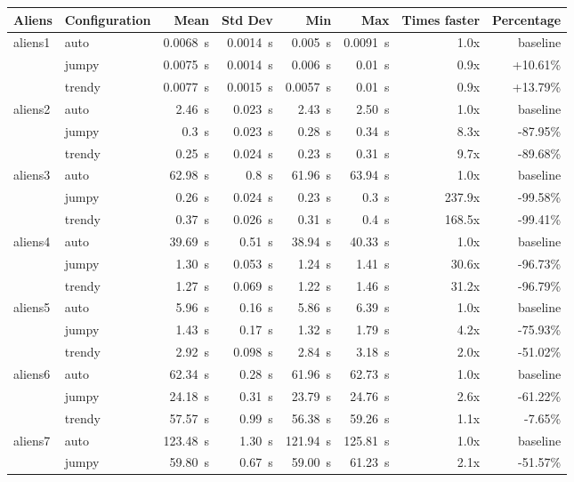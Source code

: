 \documentclass[11pt]{article}
\begin{document}
\begin{table}[h]
  \centering
  \begin{tabular}{|llrrrrrr|}
    \hline
    Aliens & Configuration & Mean & Std Dev & Min & Max & Times faster & Percentage \\
    \hline
    aliens1 & auto & 0.0068~s & 0.0014~s & 0.005~s & 0.0091~s & 1.0x & baseline \\
    & jumpy & 0.0075~s & 0.0014~s & 0.006~s & 0.01~s & 0.9x & +10.61\% \\
    & trendy & 0.0077~s & 0.0015~s & 0.0057~s & 0.01~s & 0.9x & +13.79\% \\
    \hline
    aliens2 & auto & 2.46~s & 0.023~s & 2.43~s & 2.50~s & 1.0x & baseline \\
    & jumpy & 0.3~s & 0.023~s & 0.28~s & 0.34~s & 8.3x & -87.95\% \\
    & trendy & 0.25~s & 0.024~s & 0.23~s & 0.31~s & 9.7x & -89.68\% \\
    \hline
    aliens3 & auto & 62.98~s & 0.8~s & 61.96~s & 63.94~s & 1.0x & baseline \\
    & jumpy & 0.26~s & 0.024~s & 0.23~s & 0.3~s & 237.9x & -99.58\% \\
    & trendy & 0.37~s & 0.026~s & 0.31~s & 0.4~s & 168.5x & -99.41\% \\
    \hline
    aliens4 & auto & 39.69~s & 0.51~s & 38.94~s & 40.33~s & 1.0x & baseline \\
    & jumpy & 1.30~s & 0.053~s & 1.24~s & 1.41~s & 30.6x & -96.73\% \\
    & trendy & 1.27~s & 0.069~s & 1.22~s & 1.46~s & 31.2x & -96.79\% \\
    \hline
    aliens5 & auto & 5.96~s & 0.16~s & 5.86~s & 6.39~s & 1.0x & baseline \\
    & jumpy & 1.43~s & 0.17~s & 1.32~s & 1.79~s & 4.2x & -75.93\% \\
    & trendy & 2.92~s & 0.098~s & 2.84~s & 3.18~s & 2.0x & -51.02\% \\
    \hline
    aliens6 & auto & 62.34~s & 0.28~s & 61.96~s & 62.73~s & 1.0x & baseline \\
    & jumpy & 24.18~s & 0.31~s & 23.79~s & 24.76~s & 2.6x & -61.22\% \\
    & trendy & 57.57~s & 0.99~s & 56.38~s & 59.26~s & 1.1x & -7.65\% \\
    \hline
    aliens7 & auto & 123.48~s & 1.30~s & 121.94~s & 125.81~s & 1.0x & baseline \\
    & jumpy & 59.80~s & 0.67~s & 59.00~s & 61.23~s & 2.1x & -51.57\% \\

\end{tabular}
\end{table}
\end{document}
